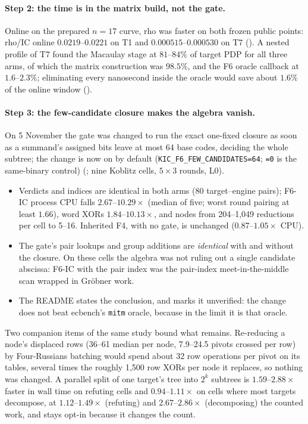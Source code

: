 \paragraph{Step 2: the time is in the matrix build, not the gate.} Online on
the prepared $n=17$ curve, rho was faster on both frozen public points:
rho/IC online $0.0219$--$0.0221$ on T1 and $0.000515$--$0.000530$ on T7
(). A nested profile of
T7 found the Macaulay stage at $81$--$84\%$ of target PDP for all three arms,
of which the matrix construction was $98.5\%$, and the F6 oracle callback at
$1.6$--$2.3\%$; eliminating every nanosecond inside the oracle would save
about $1.6\%$ of the online window
().

\paragraph{Step 3: the few-candidate closure makes the algebra vanish.} On
5 November the gate was changed to run the exact one-fixed closure as soon
as a summand's assigned bits leave at most 64 base codes, deciding the whole
subtree; the change is now on by default
(\texttt{KIC\_F6\_FEW\_CANDIDATES=64}; \texttt{=0} is the same-binary
control) (; nine Koblitz
cells, $5\times3$ rounds, L0).
\begin{itemize}
\item Verdicts and indices are identical in both arms (80 target--engine
  pairs); F6-IC process CPU
  falls $2.67$--$10.29\times$ (median of five; worst round pairing at least
  $1.66$), word XORs $1.84$--$10.13\times$, and nodes from 204--1{,}049
  reductions per cell to 5--16. Inherited F4, with no gate, is unchanged
  ($0.87$--$1.05\times$ CPU).
\item The gate's pair lookups and group additions are \emph{identical} with
  and without the closure. On these cells the algebra was not ruling out a
  single candidate abscissa: F6-IC with the pair index was the pair-index
  meet-in-the-middle scan wrapped in Gr\"obner work.
\item The README states the conclusion, and marks it unverified: the change
  does not beat ecbench's \texttt{mitm} oracle, because in the limit it is
  that oracle.
\end{itemize}
Two companion items of the same study bound what remains. Re-reducing a
node's displaced rows (36--61 median per node, 7.9--24.5 pivots crossed per
row) by Four-Russians batching would spend about 32 row operations per pivot
on its tables, several times the roughly 1{,}500 row XORs per node it
replaces, so nothing was changed. A parallel split of one target's tree into
$2^k$ subtrees is $1.59$--$2.88\times$ faster in wall time on refuting cells
and $0.94$--$1.11\times$ on cells where most targets decompose, at
$1.12$--$1.49\times$ (refuting) and $2.67$--$2.86\times$ (decomposing) the counted
work, and stays opt-in because it changes the count.

